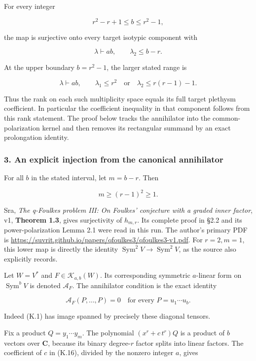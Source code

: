 \documentclass[
  10pt,
]{article}
\begin{document}
For every integer

\[
r^2-r+1\le b\le r^2-1,
\]

the map is surjective onto every target isotypic component with

\[
\boxed{\lambda\vdash ab,\qquad \lambda_2\le b-r.}
\tag{K.13}
\]

At the upper boundary \(b=r^2-1\), the larger stated range is

\[
\boxed{\lambda\vdash ab,\qquad
\lambda_1\le r^2\quad\text{or}\quad
\lambda_2\le r(r-1)-1.}
\tag{K.14}
\]

Thus the rank on each such multiplicity space equals its full target
plethysm coefficient. In particular the coefficient inequality in that
component follows from this rank statement. The proof below tracks the
annihilator into the common-polarization kernel and then removes its
rectangular summand by an exact prolongation identity.

\subsubsection{3. An explicit injection from the canonical
annihilator}\label{an-explicit-injection-from-the-canonical-annihilator}

For all \(b\) in the stated interval, let \(m=b-r\). Then

\[
m\ge(r-1)^2\ge1.
\tag{K.15}
\]

Sra, \emph{The q-Foulkes problem III: On Foulkes' conjecture with a
graded inner factor}, v1, \textbf{Theorem 1.3}, gives surjectivity of
\(h_{m,r}\). Its complete proof in §2.2 and its power-polarization Lemma
2.1 were read in this run. The author's primary PDF is
\url{https://suvrit.github.io/papers/qfoulkes3/qfoulkes3-v1.pdf}. For
\(r=2,m=1\), this lower map is directly the identity
\(\operatorname{Sym}^2V\to\operatorname{Sym}^2V\), as the source also
explicitly records.

Let \(W=V^*\) and \(F\in\mathcal K_{a,b}(W)\). Its corresponding
symmetric \(a\)-linear form on \(\operatorname{Sym}^bV\) is denoted
\(\mathcal A_F\). The annihilator condition is the exact identity

\[
\mathcal A_F(P,\ldots,P)=0
\quad\text{for every }P=u_1\cdots u_b.
\tag{K.16}
\]

Indeed (K.1) has image spanned by precisely these diagonal tensors.

Fix a product \(Q=y_1\cdots y_m\). The polynomial \((x^r+c\,t^r)Q\) is a
product of \(b\) vectors over \(\mathbf C\), because its binary
degree-\(r\) factor splits into linear factors. The coefficient of \(c\)
in (K.16), divided by the nonzero integer \(a\), gives
\end{document}
